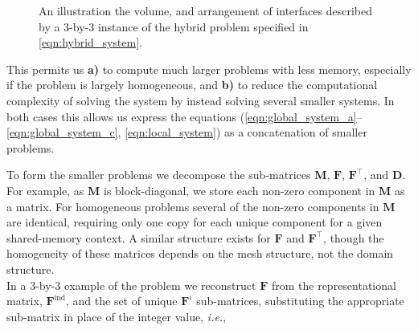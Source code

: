%
%
%
\begin{figure}
	\centering
	
	\caption{An illustration the volume, and arrangement of interfaces described by a 3-by-3 instance of the hybrid problem specified in \eqref{eqn:hybrid_system}.}
	\label{fig:volume_diagram}
\end{figure}

%
%
%
\noindent
This permits us \textbf{a)} to compute much larger problems with less memory, especially if the problem is largely homogeneous, and \textbf{b)} to reduce the computational complexity of solving the system by instead solving several smaller systems. 
In both cases this allows us express the equations (\ref{eqn:global_system_a}--\ref{eqn:global_system_c}, \ref{eqn:local_system}) as a concatenation of smaller problems. 

%
%
%
To form the smaller problems we decompose the sub-matrices $\textbf{M}$, $\textbf{F}$, $\textbf{F}^{\intercal}$, and $\textbf{D}$. 
For example, as $\textbf{M}$ is block-diagonal, we store each non-zero component in $\textbf{M}$ as a matrix. 
For homogeneous problems several of the non-zero components in $\textbf{M}$ are identical, requiring only one copy for each unique component for a given shared-memory context.
A similar structure exists for $\textbf{F}$ and $\textbf{F}^{\intercal}$, though the homogeneity of these matrices depends on the mesh structure, not the domain structure. \\

%
%
%
\noindent
In a 3-by-3 example of the problem we reconstruct $\textbf{F}$ from the representational matrix, $\textbf{F}^{\text{ind}}$, and the set of unique $\textbf{F}^{i}$ sub-matrices, substituting the appropriate sub-matrix in place of the integer value, \emph{i.e.},

